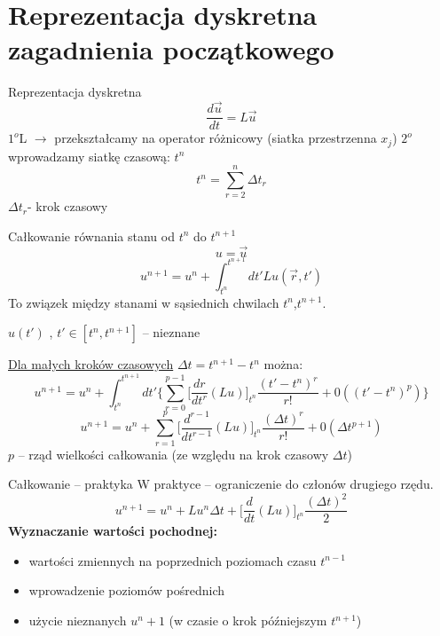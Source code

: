 \section{Reprezentacja dyskretna zagadnienia początkowego}
\begin{frame}{Reprezentacja dyskretna}
  $$\frac{d \vec{u}}{dt} = L\vec{u}$$
  $1^o$\quad L $\rightarrow$ przekształcamy na operator różnicowy (siatka przestrzenna $x_j$) \newline
  $2^o$ \quad wprowadzamy siatkę czasową: $t^n$
  $$t^n = \sum_{r=2}^{n}\Delta t_r$$
  $\Delta t_r $- krok czasowy
\end{frame}
\begin{frame}{Całkowanie równania stanu od $t^n$ do $t^{n+1}$}
  $$u = \vec{u}$$
  $${u}^{n+1} = {u}^n + \int_{t^n}^{t^{n+1}}dt' Lu(\vec{r},t')$$
  To związek między stanami w sąsiednich chwilach $t^n$,$t^{n+1}$.
  \begin{center}
  	\qquad $u(t')$ , $t' \in [t^n,t^{n+1}]$ -- nieznane
  \end{center}
\end{frame}
\begin{frame}
  \underline{Dla małych kroków czasowych} $\Delta t = t^{n+1} - t^n$ można:
  $${u}^{n+1} = {u}^n + \int_{t^n}^{t^{n+1}}dt'\Bigg\{ \sum_{r=0}^{p-1}\bigg[\frac{dr}{d t^r}(Lu)\bigg]_{t^n}\frac{(t'-t^n)^r}{r!}+0((t'-t^n)^p)\Bigg\}$$
  $${u}^{n+1} = {u}^n + \sum_{r=1}^{p}\bigg[\frac{d^{r-1}}{d t^{r-1}}(Lu)\bigg]_{t^n}\frac{(\Delta t)^r}{r!}+0(\Delta t^{p+1})$$
  $p$ -- rząd wielkości całkowania (ze względu na krok czasowy $\Delta t$)
\end{frame}
\begin{frame}{Całkowanie -- praktyka}
  W praktyce -- ograniczenie do członów drugiego rzędu.
  $$u ^{n+1} = u ^n + Lu^n\Delta t+\bigg[\frac{d}{dt}(Lu)\bigg]_{t^n} \frac{(\Delta t)^2}{2}$$
  \textbf{Wyznaczanie wartości pochodnej:}
  \begin{itemize}
    \item wartości zmiennych na poprzednich poziomach czasu $t^{n-1}$
    \item wprowadzenie poziomów pośrednich
    \item użycie nieznanych $u^n+1$ (w czasie o krok późniejszym $t^{n+1}$)
  \end{itemize}
\end{frame}

